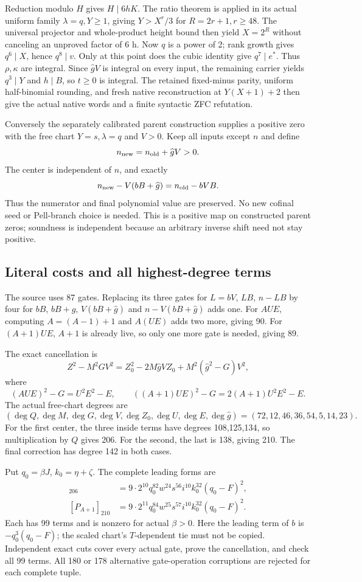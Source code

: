 Reduction modulo $H$ gives $H\mid6hK$. The ratio theorem is applied in
its actual uniform family $\lambda=q,Y\ge1$, giving $Y>X^r/3$ for
$R=2r+1,r\ge48$. The universal projector and whole-product height bound
then yield $X=2^R$ without canceling an unproved factor of 6 h. Now $q$ is
a power of 2; rank growth gives $q^6\mid X$, hence $q^8\mid v$. Only at
this point does the cubic identity give $q^7\mid e^*$.
Thus $\rho,\kappa$ are integral. Since $\widehat gV$ is integral on every
input, the remaining carrier yields $q^3\mid Y$ and $h\mid B$, so $t\ge0$
is integral. The retained fixed-minus parity, uniform half-binomial
rounding, and fresh native reconstruction at $Y(X+1)+2$ then give the
actual native words and a finite syntactic ZFC refutation.

Conversely the separately calibrated parent construction supplies a
positive zero with the free chart $Y=s,\lambda=q$ and $V>0$. Keep all
inputs except $n$ and define
\[
 n_{\rm new}=n_{\rm old}+\widehat gV>0.
\]
The center is independent of $n$, and exactly
\[
 n_{\rm new}-V(bB+\widehat g)=n_{\rm old}-bVB.
\]
Thus the numerator and final polynomial value are preserved. No new
cofinal seed or Pell-branch choice is needed. This is a positive map on
constructed parent zeros; soundness is independent because an arbitrary
inverse shift need not stay positive.

\subsection{Literal costs and all highest-degree terms}
The source uses 87 gates. Replacing its three gates for $L=bV$, $LB$,
$n-LB$ by four for $bB$, $bB+\widehat g$, $V(bB+\widehat g)$ and
$n-V(bB+\widehat g)$ adds one. For $AUE$, computing $A=(A-1)+1$
and $A(UE)$ adds two more, giving 90. For $(A+1)UE$, $A+1$ is already
live, so only one more gate is needed, giving 89.

The exact cancellation is
\[
 Z^2-M^2GV^2=Z_0^2-2M\widehat gVZ_0+M^2(\widehat g^2-G)V^2,
\]
where
\[
 (AUE)^2-G=U^2E^2-E,\qquad
 ((A+1)UE)^2-G=2(A+1)U^2E^2-E.
\]
The actual free-chart degrees are
\[
 (\deg Q,\deg M,\deg G,\deg V,\deg Z_0,\deg U,\deg E,
 \deg\widehat g)=(72,12,46,36,54,5,14,23).
\]
For the first center, the three inside terms have degrees 108,125,134,
so multiplication by $Q$ gives 206. For the second, the last is 138,
giving 210. The final correction has degree 142 in both cases.

Put $q_0=\beta J$, $k_0=\eta+\zeta$. The complete leading forms are
\begin{align*}
 [P_A]_{206}&=9\cdot2^{10}q_0^{82}w^{24}s^{56}i^{10}k_0^{32}(q_0-F)^2,\\
 [P_{A+1}]_{210}&=9\cdot2^{11}q_0^{84}w^{25}s^{57}i^{10}k_0^{32}(q_0-F)^2.
\end{align*}
Each has 99 terms and is nonzero for actual $\beta>0$. Here the leading
term of $b$ is $-q_0^3(q_0-F)$; the scaled chart's $T$-dependent tie
must not be copied. Independent exact cuts cover every actual gate,
prove the cancellation, and check all 99 terms. All 180 or 178 alternative
gate-operation corruptions are rejected for each complete tuple.

